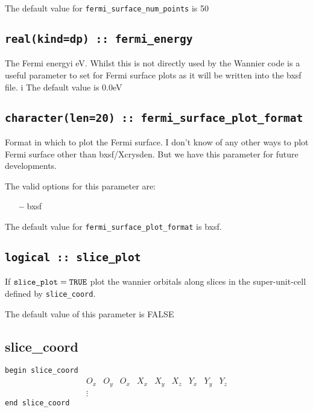 The default value for \verb#fermi_surface_num_points# is 50


\subsection[fermi\_energy]{\tt real(kind=dp) :: fermi\_energy}
The Fermi energyi eV. Whilst this is not directly used by the Wannier 
code is a useful parameter to set for Fermi surface plots as
it will be written into the bxsf file.
i
The default value is 0.0eV


\subsection[fermi\_surface\_plot\_format]{\tt character(len=20) :: fermi\_surface\_plot\_format}

Format in which to plot the Fermi surface. I don't know of any other ways
to plot Fermi surface other than bxsf/Xcrysden. But we have this
parameter for future developments. 

The valid options for this parameter are:
\begin{itemize}
\item[{\bf --}] bxsf
\end{itemize}

The default value for \verb#fermi_surface_plot_format# is bxsf.


\subsection[slice\_plot]{\tt logical :: slice\_plot}

If $\verb#slice_plot#=\verb#TRUE#$ plot the wannier orbitals along
 slices in the super-unit-cell defined by \verb#slice_coord#.




The default value of this parameter is FALSE

\subsection[slice\_coord]{slice\_coord}

\noindent \verb#begin slice_coord#
$$
\begin{array}{ccccccccc}
O_x & O_y & O_x & X_x & X_y & X_z & Y_x & Y_y & Y_z \\
\vdots
\end{array}
$$
\verb#end slice_coord#

